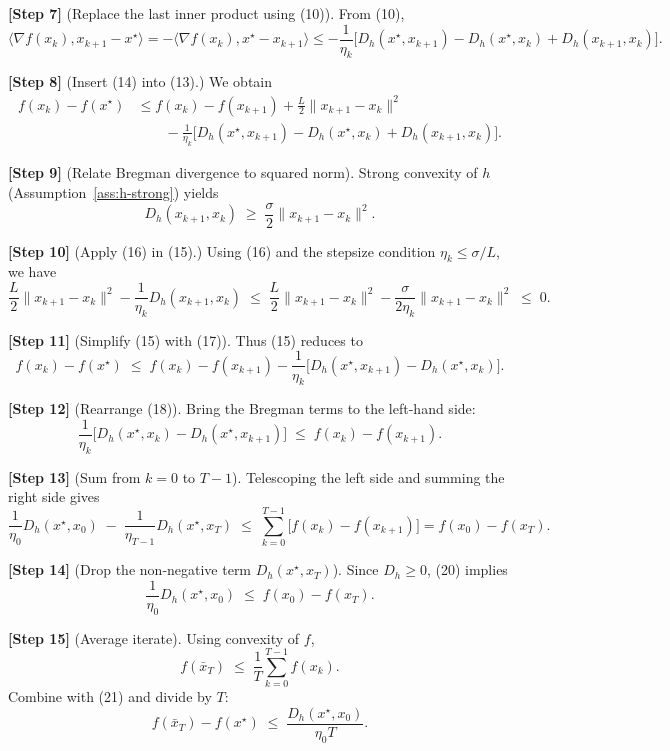 \documentclass{article}
\begin{document}
\noindent\textbf{[Step 7]} (Replace the last inner product using (10)).  
From (10),
\[
\langle\nabla f(x_{k}),x_{k+1}-x^{\star}\rangle
= -\langle\nabla f(x_{k}),x^{\star}-x_{k+1}\rangle
\le -\frac{1}{\eta_{k}}\big[D_{h}(x^{\star},x_{k+1})-D_{h}(x^{\star},x_{k})+D_{h}(x_{k+1},x_{k})\big].
\tag{14}
\]

\noindent\textbf{[Step 8]} (Insert (14) into (13).)  
We obtain
\[
\begin{aligned}
f(x_{k})-f(x^{\star})
&\le f(x_{k})-f(x_{k+1})+\frac{L}{2}\|x_{k+1}-x_{k}\|^{2} \\
&\qquad -\frac{1}{\eta_{k}}\big[D_{h}(x^{\star},x_{k+1})-D_{h}(x^{\star},x_{k})+D_{h}(x_{k+1},x_{k})\big].
\end{aligned}
\tag{15}
\]

\noindent\textbf{[Step 9]} (Relate Bregman divergence to squared norm).  
Strong convexity of $h$ (Assumption~\ref{ass:h-strong}) yields
\[
D_{h}(x_{k+1},x_{k})\;\ge\;\frac{\sigma}{2}\|x_{k+1}-x_{k}\|^{2}. \tag{16}
\]

\noindent\textbf{[Step 10]} (Apply (16) in (15).)  
Using (16) and the stepsize condition $\eta_{k}\le\sigma/L$, we have
\[
\frac{L}{2}\|x_{k+1}-x_{k}\|^{2}
-\frac{1}{\eta_{k}}D_{h}(x_{k+1},x_{k})
\;\le\;
\frac{L}{2}\|x_{k+1}-x_{k}\|^{2}
-\frac{\sigma}{2\eta_{k}}\|x_{k+1}-x_{k}\|^{2}
\;\le\;0. \tag{17}
\]

\noindent\textbf{[Step 11]} (Simplify (15) with (17)).  
Thus (15) reduces to
\[
f(x_{k})-f(x^{\star})\;\le\; f(x_{k})-f(x_{k+1})
-\frac{1}{\eta_{k}}\big[D_{h}(x^{\star},x_{k+1})-D_{h}(x^{\star},x_{k})\big]. \tag{18}
\]

\noindent\textbf{[Step 12]} (Rearrange (18)).  
Bring the Bregman terms to the left-hand side:
\[
\frac{1}{\eta_{k}}\big[D_{h}(x^{\star},x_{k})-D_{h}(x^{\star},x_{k+1})\big]
\;\le\; f(x_{k})-f(x_{k+1}). \tag{19}
\]

\noindent\textbf{[Step 13]} (Sum from $k=0$ to $T-1$).  
Telescoping the left side and summing the right side gives
\[
\frac{1}{\eta_{0}}D_{h}(x^{\star},x_{0})
\;-\;\frac{1}{\eta_{T-1}}D_{h}(x^{\star},x_{T})
\;\le\; \sum_{k=0}^{T-1}\big[f(x_{k})-f(x_{k+1})\big]
      = f(x_{0})-f(x_{T}). \tag{20}
\]

\noindent\textbf{[Step 14]} (Drop the non‑negative term $D_{h}(x^{\star},x_{T})$).  
Since $D_{h}\ge0$, (20) implies
\[
\frac{1}{\eta_{0}}D_{h}(x^{\star},x_{0})\;\le\; f(x_{0})-f(x_{T}). \tag{21}
\]

\noindent\textbf{[Step 15]} (Average iterate).  
Using convexity of $f$,
\[
f(\bar x_{T})\;\le\;\frac{1}{T}\sum_{k=0}^{T-1}f(x_{k}).
\]
Combine with (21) and divide by $T$:
\[
f(\bar x_{T})-f(x^{\star})
\;\le\;\frac{D_{h}(x^{\star},x_{0})}{\eta_{0}T}. \tag{22}
\]
\end{document}
